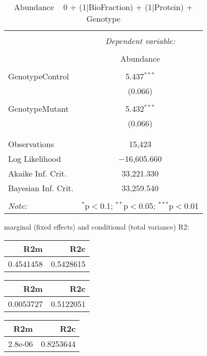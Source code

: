 \documentclass[11pt]{report}
\begin{document}
\begin{table}[!htbp] \centering 
  \caption{Abundance ~ 0 + (1|BioFraction) + (1|Protein) + Genotype} 
  \label{} 
\begin{tabular}{@{\extracolsep{5pt}}lc} 
\\[-1.8ex]\hline 
\hline \\[-1.8ex] 
 & \multicolumn{1}{c}{\textit{Dependent variable:}} \\ 
\cline{2-2} 
\\[-1.8ex] & Abundance \\ 
\hline \\[-1.8ex] 
 GenotypeControl & 5.437$^{***}$ \\ 
  & (0.066) \\ 
  & \\ 
 GenotypeMutant & 5.432$^{***}$ \\ 
  & (0.066) \\ 
  & \\ 
\hline \\[-1.8ex] 
Observations & 15,423 \\ 
Log Likelihood & $-$16,605.660 \\ 
Akaike Inf. Crit. & 33,221.330 \\ 
Bayesian Inf. Crit. & 33,259.540 \\ 
\hline 
\hline \\[-1.8ex] 
\textit{Note:}  & \multicolumn{1}{r}{$^{*}$p$<$0.1; $^{**}$p$<$0.05; $^{***}$p$<$0.01} \\ 
\end{tabular} 
\end{table} 
marginal (fixed effects) and conditional (total variance) R2:

\begin{tabular}{r|r}
\hline
R2m & R2c\\
\hline
0.4541458 & 0.5428615\\
\hline
\end{tabular}

\begin{tabular}{r|r}
\hline
R2m & R2c\\
\hline
0.0053727 & 0.5122051\\
\hline
\end{tabular}

\begin{tabular}{r|r}
\hline
R2m & R2c\\
\hline
2.8e-06 & 0.8253644\\
\hline
\end{tabular}
\end{document}
